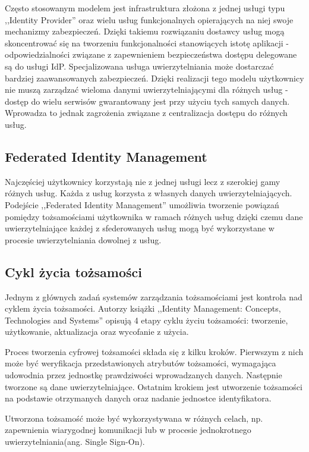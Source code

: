 		Często stosowanym modelem jest infrastruktura złożona z jednej usługi typu ,,Identity Provider'' oraz wielu usług funkcjonalnych opierających na niej swoje mechanizmy zabezpieczeń. Dzięki takiemu rozwiązaniu dostawcy usług mogą skoncentrować się na tworzeniu funkcjonalności stanowiących istotę aplikacji - odpowiedzialności związane z zapewnieniem bezpieczeństwa dostępu delegowane są do usługi IdP. Specjalizowana usługa uwierzytelniania może dostarczać bardziej zaawansowanych zabezpieczeń. Dzięki realizacji tego modelu użytkownicy nie muszą zarządzać wieloma danymi uwierzytelniającymi dla różnych usług - dostęp do wielu serwisów gwarantowany jest przy użyciu tych samych danych. Wprowadza to jednak zagrożenia związane z centralizacja dostępu do różnych usług.

	\subsection{Federated Identity Management}

		Najczęściej użytkownicy korzystają nie z jednej usługi lecz z szerokiej gamy różnych usług. Każda z usług korzysta z własnych danych uwierzytelniających. Podejście ,,Federated Identity Management'' umożliwia tworzenie powiązań pomiędzy tożsamościami użytkownika w ramach różnych usług dzięki czemu dane uwierzytelniające każdej z sfederowanych usług mogą być wykorzystane w procesie uwierzytelniania dowolnej z usług.

	\subsection{Cykl życia tożsamości}

		Jednym z głównych zadań systemów zarządzania tożsamościami jest kontrola nad cyklem życia tożsamości. Autorzy książki ,,Identity Management: Concepts, Technologies and Systems'' opisują 4 etapy cyklu życiu tożsamości: tworzenie, użytkowanie, aktualizacja oraz wycofanie z użycia\cite{Bertino11}.

		Proces tworzenia cyfrowej tożsamości składa się z kilku kroków. Pierwszym z nich może być weryfikacja przedstawionych atrybutów tożsamości, wymagająca udowodnia przez jednostkę prawdziwości wprowadzanych danych. Następnie tworzone są dane uwierzytelniające. Ostatnim krokiem jest utworzenie tożsamości na podstawie otrzymanych danych oraz nadanie jednostce identyfikatora.

		Utworzona tożsamość może być wykorzystywana w różnych celach, np. zapewnienia wiarygodnej komunikacji lub w procesie jednokrotnego uwierzytelniania(ang. Single Sign-On).

